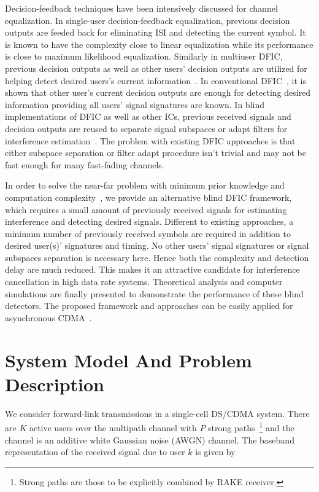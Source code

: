 \documentclass[a4paper,10pt,fleqn, twocolumn]{IEEETran}
\begin{document}
Decision-feedback techniques have been intensively discussed for
channel equalization. In single-user decision-feedback
equalization, previous decision outputs are feeded back for
eliminating ISI and detecting the current symbol. It is known to
have the complexity close to linear equalization while its
performance is close to maximum likelihood equalization. Similarly
in multiuser DFIC, previous decision outputs as well as other
users' decision outputs are utilized for helping detect desired
users's current information~\cite{Madh94,Madh98,Wang98,Verd98}. In
conventional DFIC~\cite{Verd98}, it is shown that other user's
current decision outputs are enough for detecting desired
information providing all users' signal signatures are known. In
blind implementations of DFIC as well as other ICs, previous
received signals and decision outputs are reused to separate
signal subspaces or adapt filters for interference
estimation~\cite{Madh98,Wang98}. The problem with existing DFIC
approaches is that either subspace separation or filter adapt
procedure isn't trivial and may not be fast enough for many
fast-fading channels.

In order to solve the near-far problem with minimum prior
knowledge and computation
complexity~\cite{Wang03d,Wang05A,Wang05B}, we provide an
alternative blind DFIC framework, which requires a small amount of
previously received signals for estimating interference and
detecting desired signals. Different to existing approaches, a
minimum number of previously received symbols are required in
addition to desired user(s)' signatures and timing. No other
users' signal signatures or signal subspaces separation is
necessary here. Hence both the complexity and detection delay are
much reduced. This makes it an attractive candidate for
interference cancellation in high data rate systems. Theoretical
analysis and computer simulations are finally presented to
demonstrate the performance of these blind detectors. The proposed
framework and approaches can be easily applied for asynchronous
CDMA~\cite{Wang05A}.
\section{System Model And Problem Description}
We consider forward-link transmissions in a single-cell DS/CDMA
system. There are $K$ active users over the multipath channel with
$P$ strong paths~\footnote{Strong paths are those to be explicitly
combined by RAKE receiver.} and the channel is an additive white
Gaussian noise (AWGN) channel. The baseband representation of the
received signal due to user $k$ is given by
\end{document}
